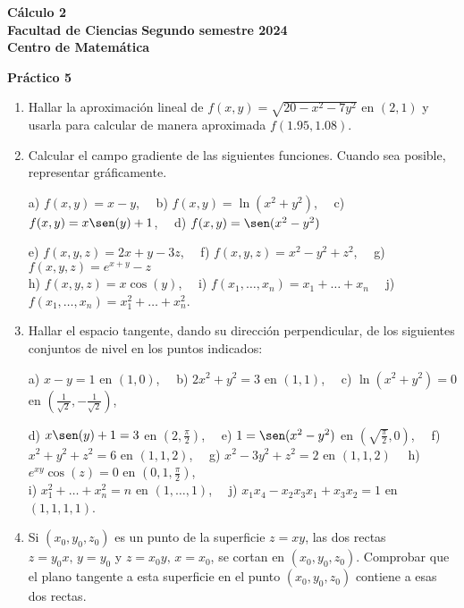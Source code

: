 \documentclass[11pt]{article}
\begin{document}
 \hfill {\bf C\'{a}lculo 2} \\
{\bf Facultad de Ciencias} \hfill {\bf Segundo semestre 2024} \\
{\bf Centro de Matem\'{a}tica} 

\vspace{1cm}

\begin{center}
{\bf Pr\'{a}ctico 5 }
\end{center}

\vspace{0,1cm}

\begin{enumerate}

\item Hallar la aproximaci\'{o}n lineal de $f(x,y)=\sqrt{20-x^{2}-7y^{2}}$ en $%
\left( 2,1\right) $ y usarla para calcular de manera aproximada $%
f(1.95,1.08).$

\item Calcular el campo gradiente de las siguientes funciones. Cuando sea posible, representar gr\'aficamente.

a) $f(x,y)=x-y$, \ \ b) $f(x,y)=\ln(x^2+y^2)$, \ \ c) $f(x,y)=x\sen(y)+1$, \ \ d) $f(x,y)=\sen(x^2-y^2)$

e) $f(x,y,z)=2x+y-3z$, \ \ f) $f(x,y,z)=x^2-y^2+z^2$, \ \ g) $f(x,y,z)=e^{x+y}-z$ \\
h) $f(x,y,z)= x\cos(y)$, \ \ i) $f(x_1,\dots,x_n)=x_1+\dots+x_n$ \ \ j) $f(x_1,\dots,x_n)=x_1^2+\dots+x_n^2$.  

\item Hallar el espacio tangente, dando su direcci\'on perpendicular, de los siguientes conjuntos de nivel en los puntos indicados:

a) $x-y=1$ en $(1,0)$, \ \ b) $2x^2+y^2=3$ en $(1,1)$, \ \ c) $\ln(x^2+y^2)=0$ en $(\frac{1}{\sqrt{2}},-\frac{1}{\sqrt{2}})$,

d) $x\sen(y)+1=3$ en $(2,\frac{\pi}{2})$, \ \ e) $1=\sen(x^2-y^2)$ en $(\sqrt{\frac{\pi}{2}},0)$, \ \ f) $x^2+y^2+z^2=6$ en $(1,1,2)$, \ \ g) $x^2-3y^2+z^2=2$ en $(1,1,2)$ \ \ h) $e^{xy}\cos(z)=0$ en $(0,1,\frac{\pi}{2})$,\\
i) $x_1^2+\dots+x_n^2=n$ en $(1,\dots,1)$, \ \ j) $x_1x_4-x_2x_3x_1+x_3x_2=1$ en $(1,1,1,1)$. 

       
\item\label{bonus6-2} Si $(x_0,y_0,z_0)$ es un punto de la superficie
  $z=xy$, las dos 
  rectas $z=y_0x,\,y=y_0$ y $z=x_0y,\,x=x_0$, se cortan en
  $(x_0,y_0,z_0)$. Comprobar que el plano tangente a esta superficie
  en el punto $(x_0,y_0,z_0)$ contiene a esas dos rectas. 


\end{enumerate}
\end{document}
